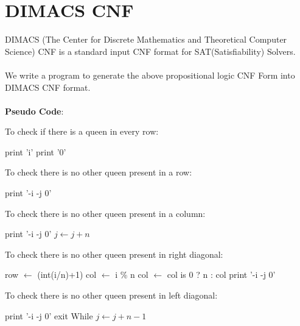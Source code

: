 \documentclass{article}
\begin{document}
\section{DIMACS CNF}
    \large DIMACS (The Center for Discrete Mathematics and Theoretical Computer Science) CNF is a standard input CNF format for SAT(Satisfiability) Solvers.
    \\
    \\We write a program to generate the above propositional logic CNF Form into DIMACS CNF format.
    \\
    \\\textbf{Pseudo Code}:
        \begin{algorithm}
        \caption{To check if there is a queen in every row:}
            \State print 'i'
                \State print '0'
            \EndIf
            \EndFor
        \end{algorithm}
        \begin{algorithm}
        \caption{To check there is no other queen present in a row:}
                        \State print '-i -j 0'
                    \EndIf
                \EndFor
            \EndFor    
        \end{algorithm}
        \begin{algorithm}
        \caption{To check there is no other queen present in a column:}
                        \State print '-i -j 0'
                    \EndIf
                    \State $j \gets j + n$
                \EndWhile
            \EndFor  
        \end{algorithm}
        \begin{algorithm}
        \caption{To check there is no other queen present in right diagonal:}
            \State row $\gets$ (int(i/n)+1)
            \State col $\gets$ i \% n
            \State col $\gets$ col is 0 ? n : col
                    \State print '-i -j 0'
                \EndIf
            \EndWhile
            \EndFor
        \end{algorithm}
        \begin{algorithm}
        \caption{To check there is no other queen present in left diagonal:}
                        \State print '-i -j 0'
                        \State exit While
                    \EndIf
                    \State $j \gets j + n - 1$
                \EndWhile
            \EndFor  
        \end{algorithm}
        \\
        \\
\end{document}
